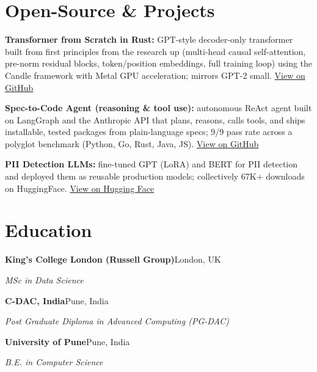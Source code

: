\documentclass[10pt,a4paper]{article}
\begin{document}
\section{Open-Source \& Projects}
\begin{tight}
  \item \textbf{Transformer from Scratch in Rust:} GPT-style decoder-only transformer built from first principles from the research up (multi-head causal self-attention, pre-norm residual blocks, token/position embeddings, full training loop) using the Candle framework with Metal GPU acceleration; mirrors GPT-2 small. \href{https://github.com/abhijeetscode/transformer-rust}{View on GitHub}
  \item \textbf{Spec-to-Code Agent (reasoning \& tool use):} autonomous ReAct agent built on LangGraph and the Anthropic API that plans, reasons, calls tools, and ships installable, tested packages from plain-language specs; 9/9 pass rate across a polyglot benchmark (Python, Go, Rust, Java, JS). \href{https://github.com/abhijeetscode/Spec-to-Code-Agent}{View on GitHub}
  \item \textbf{PII Detection LLMs:} fine-tuned GPT (LoRA) and BERT for PII detection and deployed them as reusable production models; collectively 67K+ downloads on HuggingFace. \href{https://huggingface.co/ab-ai/pii_model}{View on Hugging Face}
\end{tight}

\section{Education}
{\color{company}\bfseries King's College London (Russell Group)}\hfill {\color{muted}London, UK}\par
{\itshape MSc in Data Science}\par\vspace{2pt}
{\color{company}\bfseries C-DAC, India}\hfill {\color{muted}Pune, India}\par
{\itshape Post Graduate Diploma in Advanced Computing (PG-DAC)}\par\vspace{2pt}
{\color{company}\bfseries University of Pune}\hfill {\color{muted}Pune, India}\par
{\itshape B.E. in Computer Science}\par
\end{document}

